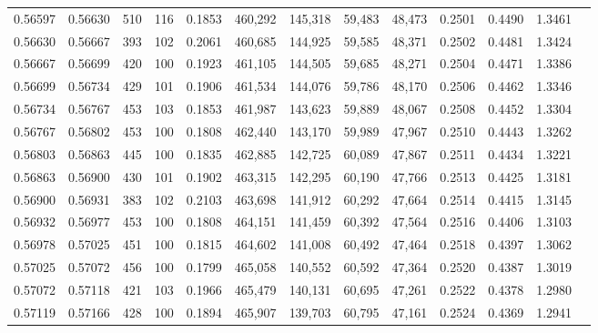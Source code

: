 \begin{tabular}{rrrrrrrrrrrrr}
0.56597 & 0.56630 &   510 & 116 &                                     0.1853 & 460,292 & 145,318 &  59,483 &  48,473 & 0.2501 & 0.4490 & 1.3461 \\
0.56630 & 0.56667 &   393 & 102 &                                     0.2061 & 460,685 & 144,925 &  59,585 &  48,371 & 0.2502 & 0.4481 & 1.3424 \\
0.56667 & 0.56699 &   420 & 100 &                                     0.1923 & 461,105 & 144,505 &  59,685 &  48,271 & 0.2504 & 0.4471 & 1.3386 \\
0.56699 & 0.56734 &   429 & 101 &                                     0.1906 & 461,534 & 144,076 &  59,786 &  48,170 & 0.2506 & 0.4462 & 1.3346 \\
0.56734 & 0.56767 &   453 & 103 &                                     0.1853 & 461,987 & 143,623 &  59,889 &  48,067 & 0.2508 & 0.4452 & 1.3304 \\
0.56767 & 0.56802 &   453 & 100 &                                     0.1808 & 462,440 & 143,170 &  59,989 &  47,967 & 0.2510 & 0.4443 & 1.3262 \\
0.56803 & 0.56863 &   445 & 100 &                                     0.1835 & 462,885 & 142,725 &  60,089 &  47,867 & 0.2511 & 0.4434 & 1.3221 \\
0.56863 & 0.56900 &   430 & 101 &                                     0.1902 & 463,315 & 142,295 &  60,190 &  47,766 & 0.2513 & 0.4425 & 1.3181 \\
0.56900 & 0.56931 &   383 & 102 &                                     0.2103 & 463,698 & 141,912 &  60,292 &  47,664 & 0.2514 & 0.4415 & 1.3145 \\
0.56932 & 0.56977 &   453 & 100 &                                     0.1808 & 464,151 & 141,459 &  60,392 &  47,564 & 0.2516 & 0.4406 & 1.3103 \\
0.56978 & 0.57025 &   451 & 100 &                                     0.1815 & 464,602 & 141,008 &  60,492 &  47,464 & 0.2518 & 0.4397 & 1.3062 \\
0.57025 & 0.57072 &   456 & 100 &                                     0.1799 & 465,058 & 140,552 &  60,592 &  47,364 & 0.2520 & 0.4387 & 1.3019 \\
0.57072 & 0.57118 &   421 & 103 &                                     0.1966 & 465,479 & 140,131 &  60,695 &  47,261 & 0.2522 & 0.4378 & 1.2980 \\
0.57119 & 0.57166 &   428 & 100 &                                     0.1894 & 465,907 & 139,703 &  60,795 &  47,161 & 0.2524 & 0.4369 & 1.2941 \\

\end{tabular}
